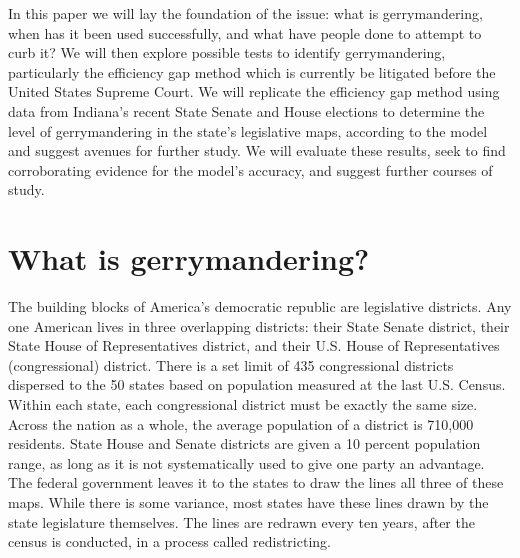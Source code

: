 \documentclass[sigconf]{acmart}
\begin{document}
In this paper we will lay the foundation of the issue: what is gerrymandering, when has it been used successfully, and what have people done to attempt to curb it? We will then explore possible tests to identify gerrymandering, particularly the efficiency gap method which is currently be litigated before the United States Supreme Court. We will replicate the efficiency gap method using data from Indiana's recent State Senate and House elections to determine the level of gerrymandering in the state's legislative maps, according to the model and suggest avenues for further study.  We will evaluate these results, seek to find corroborating evidence for the model's accuracy, and suggest further courses of study.

\section{What is gerrymandering?}
The building blocks of America's democratic republic are legislative districts. Any one American lives in three overlapping districts: their State Senate district, their State House of Representatives district, and their U.S. House of Representatives (congressional) district. There is a set limit of 435 congressional districts dispersed to the 50 states based on population measured at the last U.S. Census. Within each state, each congressional district must be exactly the same size. Across the nation as a whole, the average population of a district is 710,000 residents. State House and Senate districts are given a 10 percent population range, as long as it is not systematically used to give one party an advantage. The federal government leaves it to the states to draw the lines all three of these maps. While there is some variance, most states have these lines drawn by the state legislature themselves. The lines are redrawn every ten years, after the census is conducted, in a process called redistricting.\cite{maps}\cite{population}\cite{govtrack}
\end{document}
